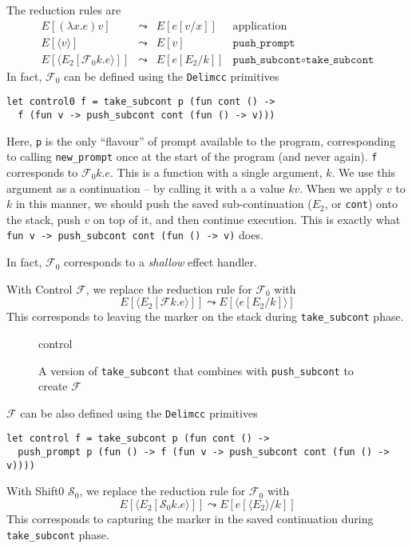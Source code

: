 The reduction rules are
\[
\begin{array}{lcll}
    E[(\lambda x. e) v] & \leadsto & E[e[v/x]] & \text{application} \\
    E[\langle v \rangle] & \leadsto & E[v] & \texttt{push\_prompt} \\ 
    E[\langle E_2[\mathcal{F}_0 k. e \rangle]] & \leadsto & E[e[E_2/k]] & \texttt{push\_subcont} \circ \texttt{take\_subcont} 
\end{array}
\]
In fact, $\mathcal{F}_0$ can be defined using the \texttt{Delimcc} primitives
\begin{verbatim}
let control0 f = take_subcont p (fun cont () ->
  f (fun v -> push_subcont cont (fun () -> v)))
\end{verbatim}
Here, \texttt{p} is the only ``flavour'' of prompt available to the program, corresponding to calling \texttt{new\_prompt} once at the start of the program (and never again). \texttt{f} corresponds to $\mathcal{F}_0 k. e$. This is a function with a single argument, $k$. We use this argument as a continuation -- by calling it with a a value $k v$. When we apply $v$ to $k$ in this manner, we should push the saved sub-continuation ($E_2$, or \texttt{cont}) onto the stack, push $v$ on top of it, and then continue execution. This is exactly what \texttt{fun v -> push\_subcont cont (fun () -> v)} does.

In fact, $\mathcal{F}_0$ corresponds to a \textit{shallow} effect handler. 

With Control $\mathcal{F}$, we replace the reduction rule for $\mathcal{F}_0$ with
\[  E[\langle E_2[\mathcal{F} k. e \rangle]] \leadsto E[\langle e[E_2/k] \rangle]\]
This corresponds to leaving the marker on the stack during \texttt{take\_subcont} phase. 

\begin{figure}[H]
    \centering
    {control}
    \caption{A version of \texttt{take\_subcont} that combines with \texttt{push\_subcont} to create $\mathcal{F}$}
    \label{fig:control-stack}
\end{figure}

$\mathcal{F}$ can be also defined using the \texttt{Delimcc} primitives
\begin{verbatim}
let control f = take_subcont p (fun cont () ->
  push_prompt p (fun () -> f (fun v -> push_subcont cont (fun () -> v))))
\end{verbatim}

With Shift0 $\mathcal{S}_0$, we replace the reduction rule for $\mathcal{F}_0$ with
\[  E[\langle E_2[\mathcal{S}_0 k. e \rangle]] \leadsto E[e[\langle E_2 \rangle/k]]\]
This corresponds to capturing the marker in the saved continuation during \texttt{take\_subcont} phase. 

